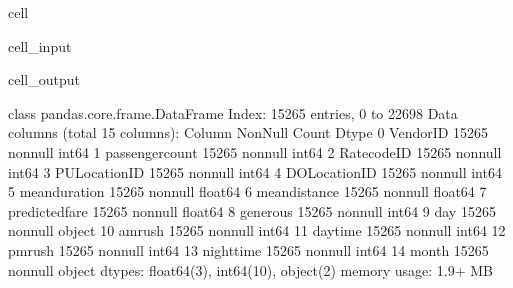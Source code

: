 \documentclass[letterpaper,10pt,english]{sphinxmanual}
\begin{document}
\begin{sphinxuseclass}{cell}
\begin{sphinxuseclass}{cell_input}
\end{sphinxuseclass}
\begin{sphinxuseclass}{cell_output}
\begin{sphinxVerbatim}[commandchars=\\\{\}]
\PYGZlt{}class \PYGZsq{}pandas.core.frame.DataFrame\PYGZsq{}\PYGZgt{}
Index: 15265 entries, 0 to 22698
Data columns (total 15 columns):
 \PYGZsh{}   Column           Non\PYGZhy{}Null Count  Dtype  
\PYGZhy{}\PYGZhy{}\PYGZhy{}  \PYGZhy{}\PYGZhy{}\PYGZhy{}\PYGZhy{}\PYGZhy{}\PYGZhy{}           \PYGZhy{}\PYGZhy{}\PYGZhy{}\PYGZhy{}\PYGZhy{}\PYGZhy{}\PYGZhy{}\PYGZhy{}\PYGZhy{}\PYGZhy{}\PYGZhy{}\PYGZhy{}\PYGZhy{}\PYGZhy{}  \PYGZhy{}\PYGZhy{}\PYGZhy{}\PYGZhy{}\PYGZhy{}  
 0   VendorID         15265 non\PYGZhy{}null  int64  
 1   passenger\PYGZus{}count  15265 non\PYGZhy{}null  int64  
 2   RatecodeID       15265 non\PYGZhy{}null  int64  
 3   PULocationID     15265 non\PYGZhy{}null  int64  
 4   DOLocationID     15265 non\PYGZhy{}null  int64  
 5   mean\PYGZus{}duration    15265 non\PYGZhy{}null  float64
 6   mean\PYGZus{}distance    15265 non\PYGZhy{}null  float64
 7   predicted\PYGZus{}fare   15265 non\PYGZhy{}null  float64
 8   generous         15265 non\PYGZhy{}null  int64  
 9   day              15265 non\PYGZhy{}null  object 
 10  am\PYGZus{}rush          15265 non\PYGZhy{}null  int64  
 11  daytime          15265 non\PYGZhy{}null  int64  
 12  pm\PYGZus{}rush          15265 non\PYGZhy{}null  int64  
 13  nighttime        15265 non\PYGZhy{}null  int64  
 14  month            15265 non\PYGZhy{}null  object 
dtypes: float64(3), int64(10), object(2)
memory usage: 1.9+ MB
\end{sphinxVerbatim}

\end{sphinxuseclass}
\end{sphinxuseclass}
\end{document}
